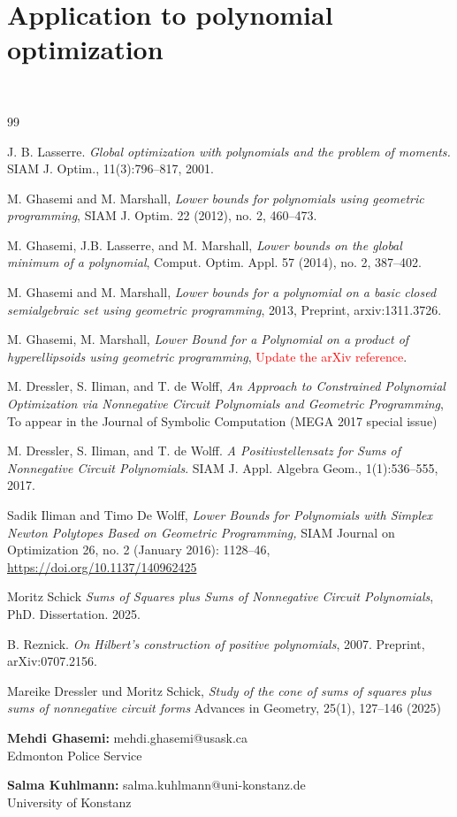 \documentclass{article}
\begin{document}
\section{Application to polynomial optimization}
\label{s06}
~~
\begin{thebibliography}{99}

 J. B. Lasserre. \emph{Global optimization with polynomials and the problem of moments.} SIAM J. Optim., 11(3):796--817, 2001.

 M. Ghasemi and M. Marshall, \emph{Lower bounds for polynomials using geometric programming}, SIAM J. Optim. 22 (2012), no. 2, 460--473.

 M. Ghasemi, J.B. Lasserre, and M. Marshall, \emph{Lower bounds on the global minimum of a polynomial}, Comput. Optim. Appl. 57 (2014), no. 2, 387--402.

 M. Ghasemi and M. Marshall, \emph{Lower bounds for a polynomial on a basic closed semialgebraic set using geometric programming}, 2013, Preprint, arxiv:1311.3726.

 M. Ghasemi, M. Marshall, \emph{Lower Bound for a Polynomial on a product of hyperellipsoids using geometric programming}, \textcolor{red}{Update the arXiv reference}.

 M. Dressler, S. Iliman, and T. de Wolff, \emph{An Approach to Constrained Polynomial Optimization via Nonnegative Circuit Polynomials and Geometric Programming}, To appear in the Journal of Symbolic Computation (MEGA 2017 special issue)

 M. Dressler, S. Iliman, and T. de Wolff. \emph{A Positivstellensatz for Sums of Nonnegative Circuit Polynomials}. SIAM J. Appl. Algebra Geom., 1(1):536--555, 2017.

 Sadik Iliman and Timo De Wolff, \emph{Lower Bounds for Polynomials with Simplex Newton Polytopes Based on Geometric Programming,} SIAM Journal on Optimization 26, no. 2 (January 2016): 1128--46, \url{https://doi.org/10.1137/140962425}

 Moritz Schick \emph{Sums of Squares plus Sums of Nonnegative Circuit Polynomials}, PhD. Dissertation. 2025.

 B. Reznick. \emph{On Hilbert's construction of positive polynomials}, 2007. Preprint, arXiv:0707.2156.

 Mareike Dressler und Moritz Schick, \emph{Study of the cone of sums of squares plus sums of nonnegative circuit forms} Advances in Geometry, 25(1), 127--146 (2025)

\end{thebibliography}

\bigskip

\noindent\textbf{Mehdi Ghasemi:} mehdi.ghasemi@usask.ca\\
Edmonton Police Service

\noindent\textbf{Salma Kuhlmann:} salma.kuhlmann@uni-konstanz.de\\
University of Konstanz
\end{document}
